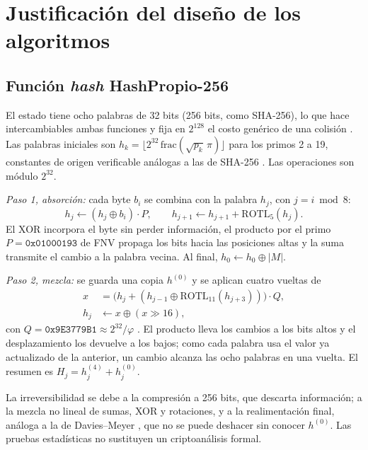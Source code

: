 \documentclass[conference]{IEEEtran}
\begin{document}
\section{Justificación del diseño de los algoritmos}
\label{sec:justificacion}

\subsection{Función \textit{hash} HashPropio-256}

El estado tiene ocho palabras de 32 bits (256 bits, como SHA-256), lo que hace intercambiables ambas funciones y fija en $2^{128}$ el costo genérico de una colisión \cite{menezes}. Las palabras iniciales son $h_k = \lfloor 2^{32}\,\mathrm{frac}(\sqrt{p_k}\,\pi)\rfloor$ para los primos 2 a 19, constantes de origen verificable análogas a las de SHA-256 \cite{fips180}. Las operaciones son módulo $2^{32}$.

\textit{Paso 1, absorción:} cada byte $b_i$ se combina con la palabra $h_j$, con $j = i \bmod 8$:
\begin{equation}
h_j \leftarrow (h_j \oplus b_i)\cdot P, \qquad h_{j+1} \leftarrow h_{j+1} + \mathrm{ROTL}_5(h_j).
\end{equation}
El XOR incorpora el byte sin perder información, el producto por el primo $P = \texttt{0x01000193}$ de FNV \cite{fnv} propaga los bits hacia las posiciones altas y la suma transmite el cambio a la palabra vecina. Al final, $h_0 \leftarrow h_0 \oplus |M|$.

\textit{Paso 2, mezcla:} se guarda una copia $h^{(0)}$ y se aplican cuatro vueltas de
\begin{align}
x &= \bigl(h_j + (h_{j-1} \oplus \mathrm{ROTL}_{11}(h_{j+3}))\bigr)\cdot Q, \\
h_j &\leftarrow x \oplus (x \gg 16),
\end{align}
con $Q = \texttt{0x9E3779B1} \approx 2^{32}/\varphi$ \cite{knuth}. El producto lleva los cambios a los bits altos y el desplazamiento los devuelve a los bajos; como cada palabra usa el valor ya actualizado de la anterior, un cambio alcanza las ocho palabras en una vuelta. El resumen es $H_j = h_j^{(4)} + h_j^{(0)}$.

La irreversibilidad se debe a la compresión a 256 bits, que descarta información; a la mezcla no lineal de sumas, XOR y rotaciones, y a la realimentación final, análoga a la de Davies--Meyer \cite{menezes}, que no se puede deshacer sin conocer $h^{(0)}$. Las pruebas estadísticas no sustituyen un criptoanálisis formal.
\end{document}
